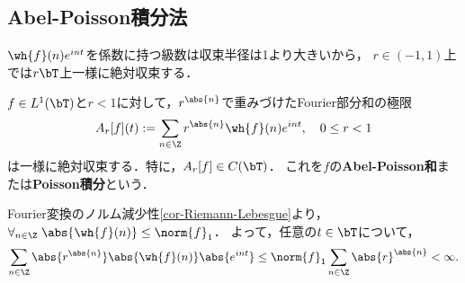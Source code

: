 \documentclass[uplatex,dvipdfmx]{jsreport}
\begin{document}
\subsection{Abel-Poisson積分法}

\begin{tcolorbox}[colframe=ForestGreen, colback=ForestGreen!10!white,breakable,colbacktitle=ForestGreen!40!white,coltitle=black,fonttitle=\bfseries\sffamily,
title=]
    $\wh{f}(n)e^{int}$を係数に持つ級数は収束半径は1より大きいから，
    $r\in(-1,1)$上では$r\bT$上一様に絶対収束する．
\end{tcolorbox}

\begin{proposition}\label{prop-Abel-Poisson-sum}
    $f\in L^1(\bT)$と$r<1$に対して，$r^{\abs{n}}$で重みづけたFourier部分和の極限
    \[A_r[f](t):=\sum_{n\in\Z}r^{\abs{n}}\wh{f}(n)e^{int},\quad 0\le r<1\]
    は一様に絶対収束する．特に，$A_r[f]\in C(\bT)$．
    これを$f$の\textbf{Abel-Poisson和}または\textbf{Poisson積分}という．
\end{proposition}
\begin{Proof}
    Fourier変換のノルム減少性\ref{cor-Riemann-Lebesgue}より，$\forall_{n\in\Z}\;\abs{\wh{f}(n)}\le\norm{f}_1$．
    よって，任意の$t\in\bT$について，
    \[\sum_{n\in\Z}\abs{r^{\abs{n}}}\abs{\wh{f}(n)}\abs{e^{int}}\le\norm{f}_1\sum_{n\in\Z}\abs{r}^{\abs{n}}<\infty.\]
\end{Proof}
\end{document}
